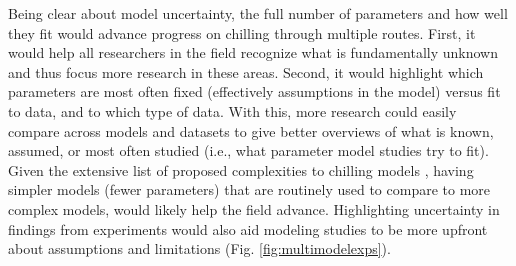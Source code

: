 \documentclass[11pt]{article}
\begin{document}
Being clear about model uncertainty, the full number of parameters and how well they fit would advance progress on chilling through multiple routes. First, it would help all researchers in the field recognize what is fundamentally unknown and thus focus more research in these areas. Second, it would highlight which parameters are most often fixed (effectively assumptions in the model) %
versus fit to data, and to which type of data. With this, more research could easily compare across models and datasets to give better overviews of what is known, assumed, or most often studied (i.e., what parameter model studies try to fit). Given the extensive list of proposed complexities to chilling models \citep{lamb1948effect,campbell1979,leinonen1996dependence,cook2005freezing,Man:2010aa,Jones:2012,Sonsteby:2014aa}, having simpler models (fewer parameters) that are routinely used to compare to more complex models, would likely help the field advance. %
Highlighting uncertainty in findings from experiments would also aid modeling studies to be more upfront about assumptions and limitations (Fig. \ref{fig:multimodelexps}).

\end{document}
